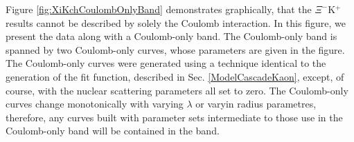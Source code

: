 \documentclass[../AnalysisNoteJBuxton.tex]{subfiles}
\begin{document}

Figure \ref{fig:XiKchCoulombOnlyBand} demonstrates graphically, that the $\Xi^{-}$K$^{+}$ results cannot be described by solely the Coulomb interaction.  In this figure, we present the data along with a Coulomb-only band.  The Coulomb-only band is spanned by two Coulomb-only curves, whose parameters are given in the figure. The Coulomb-only curves were generated using a technique identical to the generation of the fit function, described in Sec. \ref{ModelCascadeKaon}, except, of course, with the nuclear scattering parameters all set to zero.  The Coulomb-only curves change monotonically with varying $\lambda$ or varyin radius parametres, therefore, any curves built with parameter sets intermediate to those use in the Coulomb-only band will be contained in the band.
\end{document}

